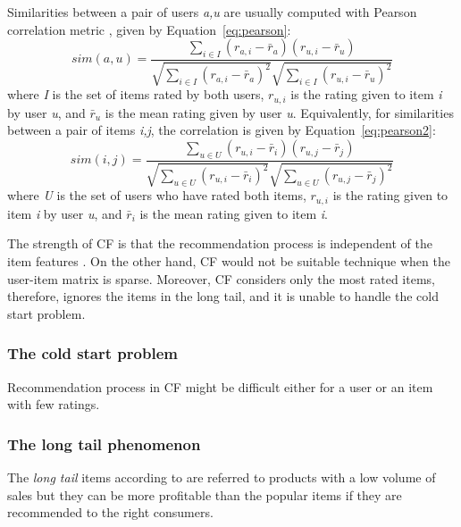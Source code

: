 Similarities between a pair of users \emph{a,u} are usually computed with Pearson correlation metric \parencite{sarwar2001item}, given by Equation~\eqref{eq:pearson}:
\begin{equation}
	sim(a,u) =\frac{\sum _{i\in I}(r_{a,i} - \bar{r}_a)(r_{u,i} - \bar{r}_u)}{\sqrt{\sum _{i\in I}(r_{a,i} - \bar{r}_a)^2} \sqrt{\sum _{i\in I}(r_{u,i} - \bar{r}_u)^2}}
	\label{eq:pearson}
\end{equation}
where \emph{I} is the set of items rated by both users, $r_{u,i}$ is the rating given to item \emph{i} by user \emph{u}, and $\bar{r}_u$ is the mean rating given by user \emph{u}. Equivalently, for similarities between a pair of items \emph{i,j}, the correlation is given by Equation~\eqref{eq:pearson2}:
\begin{equation}
sim(i,j) =\frac{\sum _{u\in U}(r_{u,i} - \bar{r}_i)(r_{u,j} - \bar{r}_j)}{\sqrt{\sum _{u\in U}(r_{u,i} - \bar{r}_i)^2} \sqrt{\sum _{u\in U}(r_{u,j} - \bar{r}_j)^2}}
\label{eq:pearson2}
\end{equation}
where \emph{U} is the set of users who have rated both items, $r_{u,i}$ is the rating given to item \emph{i} by user \emph{u}, and $\bar{r}_i$ is the mean rating given to item \emph{i}.

The strength of CF is that the recommendation process is independent of the item features \parencite{Burke2002331}. On the other hand, CF would not be suitable technique when the user-item matrix is sparse. Moreover, CF considers only the most rated items, therefore, ignores the items in the long tail, and it is unable to handle the cold start problem. \parencite{Dai20141760}

\subsubsection{The cold start problem}
Recommendation process in CF might be difficult either for a user or an item with few ratings. \parencite{Burke2002331}

\subsubsection{The long tail phenomenon}
The \textit{long tail} items according to \textcite{Yin2012896} are referred to products with a low volume of sales but they can be more profitable than the popular items if they are recommended to the right consumers.

